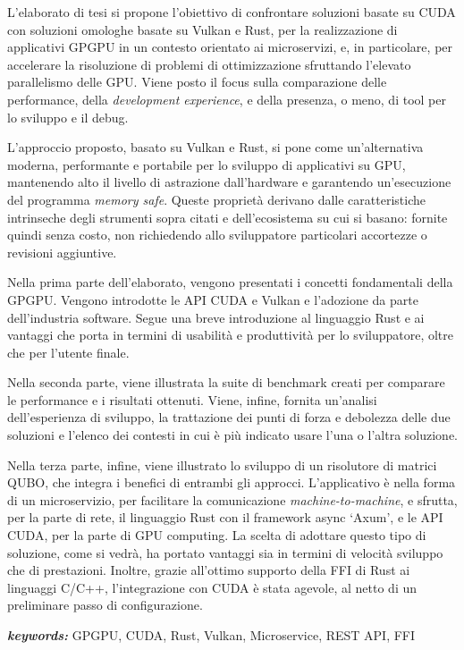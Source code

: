 
L'elaborato di tesi si propone l'obiettivo di confrontare soluzioni basate su CUDA con soluzioni omologhe basate su Vulkan e Rust, per la realizzazione di applicativi GPGPU in un contesto orientato ai microservizi, e, in particolare, per accelerare la risoluzione di problemi di ottimizzazione sfruttando l'elevato parallelismo delle GPU. Viene posto il focus sulla comparazione delle performance, della \textit{development experience}, e della presenza, o meno, di tool per lo sviluppo e il debug.

L'approccio proposto, basato su Vulkan e Rust, si pone come un'alternativa moderna, performante e portabile per lo sviluppo di applicativi su GPU, mantenendo alto il livello di astrazione dall'hardware e garantendo un'esecuzione del programma \textit{memory safe}. Queste proprietà derivano dalle caratteristiche intrinseche degli strumenti sopra citati e dell'ecosistema su cui si basano: fornite quindi senza costo, non richiedendo allo sviluppatore particolari accortezze o revisioni aggiuntive.

Nella prima parte dell'elaborato, vengono presentati i concetti fondamentali della GPGPU. Vengono introdotte le API CUDA e Vulkan e l'adozione da parte dell'industria software. Segue una breve introduzione al linguaggio Rust e ai vantaggi che porta in termini di usabilità e produttività per lo sviluppatore, oltre che per l'utente finale.

Nella seconda parte, viene illustrata la suite di benchmark creati per comparare le performance e i risultati ottenuti. Viene, infine, fornita un'analisi dell'esperienza di sviluppo, la trattazione dei punti di forza e debolezza delle due soluzioni e l'elenco dei contesti in cui è più indicato usare l'una o l'altra soluzione.

Nella terza parte, infine, viene illustrato lo sviluppo di un risolutore di matrici QUBO, che integra i benefici di entrambi gli approcci. L'applicativo è nella forma di un microservizio, per facilitare la comunicazione \textit{machine-to-machine}, e sfrutta, per la parte di rete, il linguaggio Rust con il framework async `Axum', e le API CUDA, per la parte di GPU computing. La scelta di adottare questo tipo di soluzione, come si vedrà, ha portato vantaggi sia in termini di velocità sviluppo che di prestazioni. Inoltre, grazie all'ottimo supporto della FFI di Rust ai linguaggi C/C++, l'integrazione con CUDA è stata agevole, al netto di un preliminare passo di configurazione.

\bigskip

\textit{\textbf{keywords:}} GPGPU, CUDA, Rust, Vulkan, Microservice, REST API, FFI